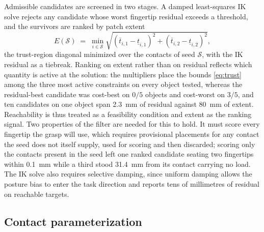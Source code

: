 Admissible candidates are screened in two stages. A damped least-squares IK solve
rejects any candidate whose worst fingertip residual exceeds a threshold, and the
survivors are ranked by patch extent
%
\begin{equation}
  E(\mathcal{S}) \;=\; \min_{i \in \mathcal{S}}
    \sqrt{(\overline{t}_{i,1} - \underline{t}_{i,1})^2 + (\overline{t}_{i,2} - \underline{t}_{i,2})^2},
  \label{eq:patch-extent}
\end{equation}
%
the trust-region diagonal minimized over the contacts of seed $\mathcal{S}$, with the
IK residual as a tiebreak. Ranking on extent rather than on residual reflects which
quantity is active at the solution: the multipliers place the bounds \eqref{eq:trust}
among the three most active constraints on every object tested, whereas the
residual-best candidate was cost-best on $0/5$ objects and cost-worst on $3/5$, and ten
candidates on one object span \SI{2.3}{\milli\meter} of residual against
\SI{80}{\milli\meter} of extent. Reachability is thus treated as a feasibility
condition and extent as the ranking signal. Two properties of the filter are needed for
this to hold. It must score every fingertip the grasp will use, which requires
provisional placements for any contact the seed does not itself supply, used for
scoring and then discarded; scoring only the contacts present in the seed left one
ranked candidate seating two fingertips within \SI{0.1}{\milli\meter} while a third
stood \SI{31.4}{\milli\meter} from its contact carrying no load. The IK solve also
requires selective damping, since uniform damping allows the posture bias to enter the
task direction and reports tens of millimetres of residual on reachable targets.

\subsection{Contact parameterization}
\label{sec:contact-param}


